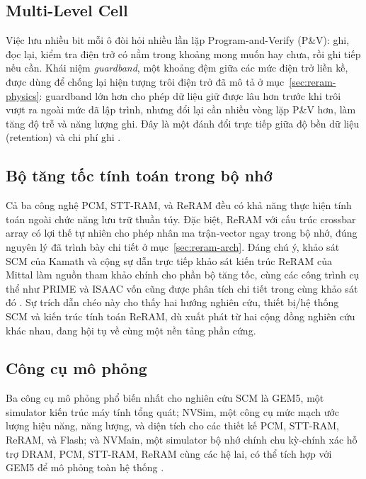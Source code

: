 \documentclass[12pt,a4paper]{article}
\begin{document}
\subsection{Multi-Level Cell}

Việc lưu nhiều bit mỗi ô đòi hỏi nhiều lần lặp Program-and-Verify (P\&V): ghi, đọc lại, kiểm tra điện trở có nằm trong khoảng mong muốn hay chưa, rồi ghi tiếp nếu cần. Khái niệm \textit{guardband}, một khoảng đệm giữa các mức điện trở liền kề, được dùng để chống lại hiện tượng trôi điện trở đã mô tả ở mục~\ref{sec:reram-physics}: guardband lớn hơn cho phép dữ liệu giữ được lâu hơn trước khi trôi vượt ra ngoài mức đã lập trình, nhưng đổi lại cần nhiều vòng lặp P\&V hơn, làm tăng độ trễ và năng lượng ghi. Đây là một đánh đổi trực tiếp giữa độ bền dữ liệu (retention) và chi phí ghi \cite{kamath2019}.

\subsection{Bộ tăng tốc tính toán trong bộ nhớ}

Cả ba công nghệ PCM, STT-RAM, và ReRAM đều có khả năng thực hiện tính toán ngoài chức năng lưu trữ thuần túy. Đặc biệt, ReRAM với cấu trúc crossbar array có lợi thế tự nhiên cho phép nhân ma trận-vector ngay trong bộ nhớ, đúng nguyên lý đã trình bày chi tiết ở mục~\ref{sec:reram-arch}. Đáng chú ý, khảo sát SCM của Kamath và cộng sự dẫn trực tiếp khảo sát kiến trúc ReRAM của Mittal làm nguồn tham khảo chính cho phần bộ tăng tốc, cùng các công trình cụ thể như PRIME và ISAAC vốn cũng được phân tích chi tiết trong cùng khảo sát đó \cite{kamath2019, mittal2019}. Sự trích dẫn chéo này cho thấy hai hướng nghiên cứu, thiết bị/hệ thống SCM và kiến trúc tính toán ReRAM, dù xuất phát từ hai cộng đồng nghiên cứu khác nhau, đang hội tụ về cùng một nền tảng phần cứng.

\subsection{Công cụ mô phỏng}

Ba công cụ mô phỏng phổ biến nhất cho nghiên cứu SCM là GEM5, một simulator kiến trúc máy tính tổng quát; NVSim, một công cụ mức mạch ước lượng hiệu năng, năng lượng, và diện tích cho các thiết kế PCM, STT-RAM, ReRAM, và Flash; và NVMain, một simulator bộ nhớ chính chu kỳ-chính xác hỗ trợ DRAM, PCM, STT-RAM, ReRAM cùng các hệ lai, có thể tích hợp với GEM5 để mô phỏng toàn hệ thống \cite{kamath2019}.
\end{document}
